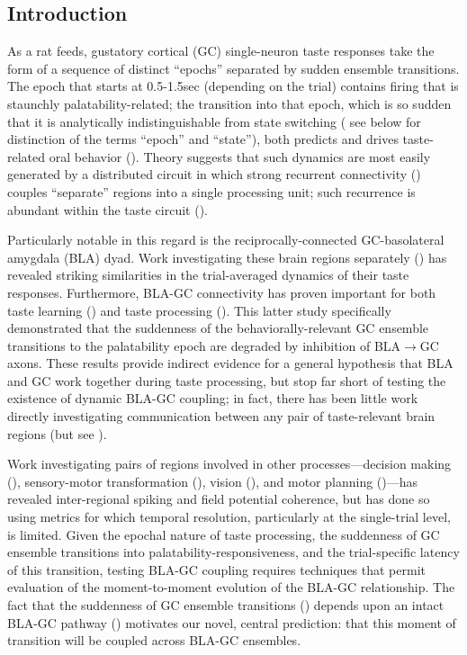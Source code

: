 \begin{refsection}
\section{Introduction}
As a rat feeds, gustatory cortical (GC) single-neuron taste responses take the form of a sequence of distinct “epochs” separated by sudden ensemble transitions. The epoch that starts at 0.5-1.5sec (depending on the trial) contains firing that is staunchly palatability-related; the transition into that epoch, which is so sudden that it is analytically indistinguishable from state switching (\cite{sadacca2016a} see below for distinction of the terms “epoch” and “state”), both predicts and drives taste-related oral behavior (\cite{sadacca2012a,li2016a,mukherjee2019a}). Theory suggests that such dynamics are most easily generated by a distributed circuit in which strong recurrent connectivity (\cite{maass2007a, miller2010a, miller2013a,edelman2013a,mante2013a,kietzmann2019a}) couples “separate” regions into a single processing unit; such recurrence is abundant within the taste circuit (\cite{bielavska1996a,mcdonald1998a,shi1998a}).

Particularly notable in this regard is the reciprocally-connected GC-basolateral amygdala (BLA) dyad. Work investigating these brain regions separately (\cite{katz2001a,fontanini2009a,sadacca2012a}) has revealed striking similarities in the trial-averaged dynamics of their taste responses. Furthermore, BLA-GC connectivity has proven important for both taste learning (\cite{lin2012a,lin2015a,lavi2018a,kayyal2019a}) and taste processing (\cite{lin2021a}). This latter study specifically demonstrated that the suddenness of the behaviorally-relevant GC ensemble transitions to the palatability epoch are degraded by inhibition of BLA$\rightarrow$GC axons. These results provide indirect evidence for a general hypothesis that BLA and GC work together during taste processing, but stop far short of testing the existence of dynamic BLA-GC coupling; in fact, there has been little work directly investigating communication between any pair of taste-relevant brain regions (but see \cite{lorenzo1997a}).

Work investigating pairs of regions involved in other processes—decision making (\cite{antzoulatos2016a,place2016a,zielinski2019a}), sensory-motor transformation (\cite{arce-mcshane2016a}), vision (\cite{bastos2015a,zandvakili2015a,saravani2019a,lundqvist2020a}), and motor planning (\cite{yates2017a,ames2019a})—has revealed inter-regional spiking and field potential coherence, but has done so using metrics for which temporal resolution, particularly at the single-trial level, is limited. Given the epochal nature of taste processing, the suddenness of GC ensemble transitions into palatability-responsiveness, and the trial-specific latency of this transition, testing BLA-GC coupling requires techniques that permit evaluation of the moment-to-moment evolution of the BLA-GC relationship. The fact that the suddenness of GC ensemble transitions (\cite{sadacca2016a,mukherjee2019a}) depends upon an intact BLA-GC pathway (\cite{lin2021a}) motivates our novel, central prediction: that this moment of transition will be coupled across BLA-GC ensembles. 


\end{refsection}
